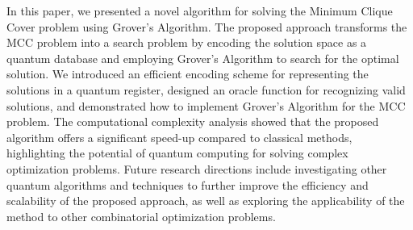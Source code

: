 In this paper, we presented a novel algorithm for solving the Minimum Clique Cover problem using Grover's Algorithm. The proposed approach transforms the MCC problem into a search problem by encoding the solution space as a quantum database and employing Grover's Algorithm to search for the optimal solution. We introduced an efficient encoding scheme for representing the solutions in a quantum register, designed an oracle function for recognizing valid solutions, and demonstrated how to implement Grover's Algorithm for the MCC problem. The computational complexity analysis showed that the proposed algorithm offers a significant speed-up compared to classical methods, highlighting the potential of quantum computing for solving complex optimization problems. Future research directions include investigating other quantum algorithms and techniques to further improve the efficiency and scalability of the proposed approach, as well as exploring the applicability of the method to other combinatorial optimization problems.

